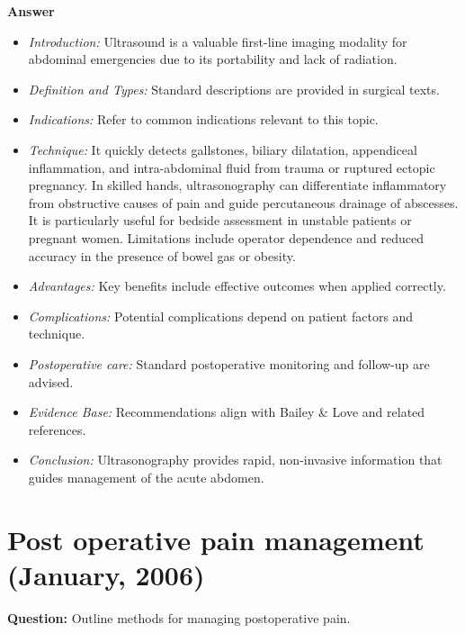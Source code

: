 \documentclass{article}
\begin{document}
\textbf{Answer}
\begin{itemize}

\item \emph{Introduction:} Ultrasound is a valuable first-line imaging modality for abdominal emergencies due to its portability and lack of radiation.
\item \emph{Definition and Types:} Standard descriptions are provided in surgical texts.
\item \emph{Indications:} Refer to common indications relevant to this topic.

\item \emph{Technique:} It quickly detects gallstones, biliary dilatation, appendiceal inflammation, and intra-abdominal fluid from trauma or ruptured ectopic pregnancy. In skilled hands, ultrasonography can differentiate inflammatory from obstructive causes of pain and guide percutaneous drainage of abscesses. It is particularly useful for bedside assessment in unstable patients or pregnant women. Limitations include operator dependence and reduced accuracy in the presence of bowel gas or obesity.
\item \emph{Advantages:} Key benefits include effective outcomes when applied correctly.
\item \emph{Complications:} Potential complications depend on patient factors and technique.
\item \emph{Postoperative care:} Standard postoperative monitoring and follow-up are advised.
\item \emph{Evidence Base:} Recommendations align with Bailey \& Love and related references.

\item \emph{Conclusion:} Ultrasonography provides rapid, non-invasive information that guides management of the acute abdomen.


\end{itemize}

\section{Post operative pain management (January, 2006)}

\textbf{Question:} Outline methods for managing postoperative pain.
\end{document}
